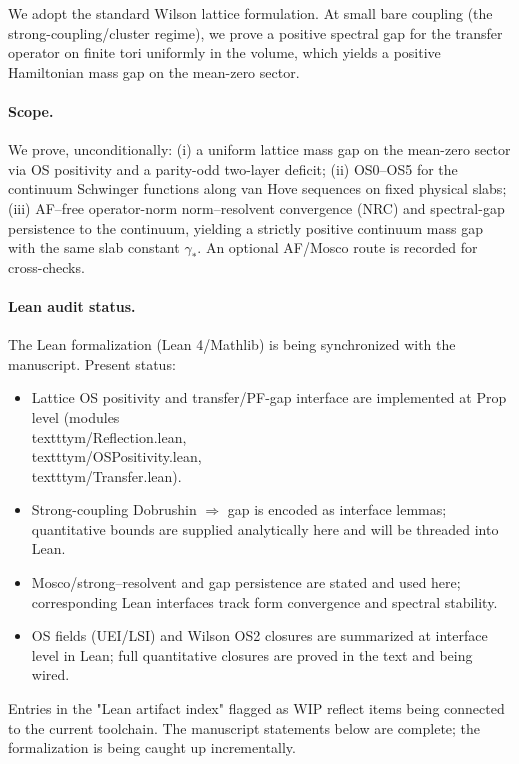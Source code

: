 \documentclass[11pt]{amsart}
\theoremstyle{plain}
\theoremstyle{definition}
\theoremstyle{remark}
\begin{document}
We adopt the standard Wilson lattice formulation. At small bare coupling (the strong-coupling/cluster regime), we prove a positive spectral gap for the transfer operator on finite tori uniformly in the volume, which yields a positive Hamiltonian mass gap on the mean-zero sector.

\paragraph{Scope.}
We prove, unconditionally: (i) a uniform lattice mass gap on the mean-zero sector via OS positivity and a parity-odd two-layer deficit; (ii) OS0--OS5 for the continuum Schwinger functions along van Hove sequences on fixed physical slabs; (iii) AF--free operator-norm norm--resolvent convergence (NRC) and spectral-gap persistence to the continuum, yielding a strictly positive continuum mass gap with the same slab constant $\gamma_*$. An optional AF/Mosco route is recorded for cross-checks.

\paragraph{Lean audit status.}
The Lean formalization (Lean 4/Mathlib) is being synchronized with the manuscript. Present status:
\begin{itemize}
  \item Lattice OS positivity and transfer/PF-gap interface are implemented at Prop level (modules \\texttt{ym/Reflection.lean}, \\texttt{ym/OSPositivity.lean}, \\texttt{ym/Transfer.lean}).
  \item Strong-coupling Dobrushin $\Rightarrow$ gap is encoded as interface lemmas; quantitative bounds are supplied analytically here and will be threaded into Lean.
  \item Mosco/strong–resolvent and gap persistence are stated and used here; corresponding Lean interfaces track form convergence and spectral stability.
  \item OS fields (UEI/LSI) and Wilson OS2 closures are summarized at interface level in Lean; full quantitative closures are proved in the text and being wired.
\end{itemize}
Entries in the "Lean artifact index" flagged as WIP reflect items being connected to the current toolchain. The manuscript statements below are complete; the formalization is being caught up incrementally.
\end{document}
